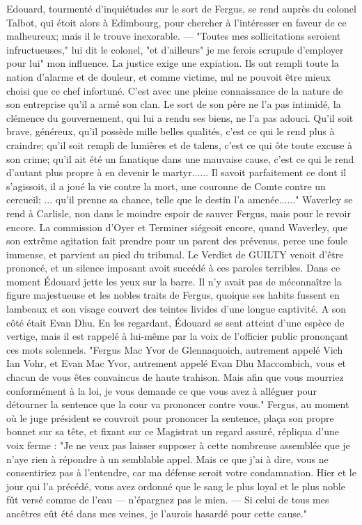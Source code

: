 {Edouard, tourmenté d'inquiétudes sur le sort de Fergus, se rend auprès du colonel Talbot, qui étoit alors à Edimbourg, pour chercher à l'intéresser en faveur de ce malheureux; mais il le trouve inexorable. — "Toutes mes sollicitations seroient infructueuses," lui dit le colonel, "et d'ailleurs" je me ferois scrupule d'employer pour lui" mon influence. La justice exige une expiation. Ils ont rempli toute la nation d'alarme et de douleur, et comme victime,\setcounter{page}{372} nul ne pouvoit être mieux choisi que ce chef infortuné. C'est avec une pleine connaissance de la nature de son entreprise qu'il a armé son clan. Le sort de son père ne l'a pas intimidé, la clémence du gouvernement, qui lui a rendu ses biens, ne l'a pas adouci. Qu'il soit brave, généreux, qu'il possède mille belles qualités, c'est ce qui le rend plus à craindre; qu'il soit rempli de lumières et de talens, c'est ce qui ôte toute excuse à son crime; qu'il ait été un fanatique dans une mauvaise cause, c'est ce qui le rend d'autant plus propre à en devenir le martyr...... Il savoit parfaitement ce dont il s'agissoit, il a joué la vie contre la mort, une couronne de Comte contre un cercueil; ... qu'il prenne sa chance, telle que le destin l'a amenée......"
Waverley se rend à Carlisle, non dans le moindre espoir de sauver Fergus, mais pour le revoir encore.
La commission d'Oyer et Terminer siégeoit encore, quand Waverley, que son extrême agitation fait prendre pour un parent des prévenus, perce une foule immense, et parvient au pied du tribunal. Le Verdict de GUILTY venoit d'être prononcé, et un silence imposant avoit succédé à ces paroles\setcounter{page}{373} terribles. Dans ce moment Édouard jette les yeux sur la barre. Il n'y avait pas de méconnaître la figure majestueuse et les nobles traits de Fergus, quoique ses habits fussent en lambeaux et son visage couvert des teintes livides d'une longue captivité. A son côté était Evan Dhu. En les regardant, Édouard se sent atteint d'une espèce de vertige, mais il est rappelé à lui-même par la voix de l'officier public prononçant ces mots solennels. "Fergus Mac Yvor de Glennaquoich, autrement appelé Vich Ian Vohr, et Evan Mac Yvor, autrement appelé Evan Dhu Maccombich, vous et chacun de vous êtes convaincus de haute trahison. Mais afin que vous mourriez conformément à la loi, je vous demande ce que vous avez à alléguer pour détourner la sentence que la cour va prononcer contre vous."
Fergus, au moment où le juge président se couvroit pour prononcer la sentence, plaça son propre bonnet sur sa tête, et fixant sur ce Magistrat un regard assuré, répliqua d'une voix ferme : "Je ne veux pas laisser supposer à cette nombreuse assemblée que je n'aye rien à répondre à un semblable appel. Mais ce que j'ai à dire, vous ne consentiriez pas à l'entendre,\setcounter{page}{374} car ma défense seroit votre condamnation. Hier et le jour qui l'a précédé, vous avez ordonné que le sang le plus loyal et le plus noble fût versé comme de l'eau — n'épargnez pas le mien. — Si celui de tous mes ancêtres eût été dans mes veines, je l'aurois hasardé pour cette cause."
}
